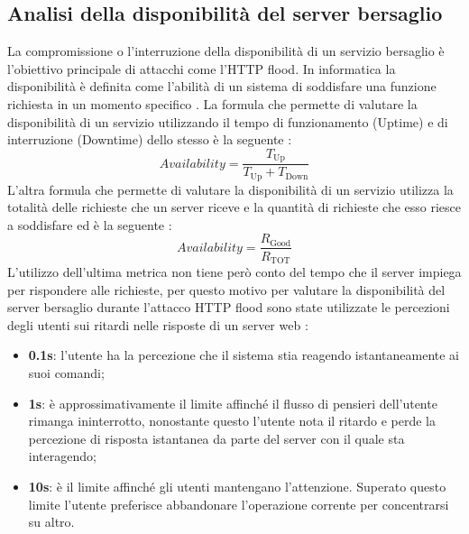 \subsection{Analisi della disponibilità del server bersaglio}
La compromissione o l'interruzione della disponibilità di un servizio bersaglio è l'obiettivo principale di attacchi come l'HTTP flood. In informatica la disponibilità è definita come l'abilità di un sistema di soddisfare una funzione richiesta in un momento specifico \cite{availability}. 
La formula che permette di valutare la disponibilità di un servizio utilizzando il tempo di funzionamento (Uptime) e di interruzione (Downtime) dello stesso è la seguente \cite{formula_availability}:
\begin{equation} \label{formula1}
Availability = \frac{T_\text{Up}}{T_\text{Up}+T_\text{Down}}
\end{equation}
L'altra formula che permette di valutare la disponibilità di un servizio utilizza la totalità delle richieste che un server riceve e la quantità di richieste che esso riesce a soddisfare ed è la seguente \cite{formula_availability}:
\begin{equation} \label{formula2}
Availability = \frac{R_\text{Good}}{R_\text{TOT}}
\end{equation}
L'utilizzo dell'ultima metrica non tiene però conto del tempo che il server impiega per rispondere alle richieste, per questo motivo per valutare la disponibilità del server bersaglio durante l'attacco HTTP flood sono state utilizzate le percezioni degli utenti sui ritardi nelle risposte di un server web \cite{soglie_attenzione}:
\begin{itemize}
    \item \textbf{0.1s}: l'utente ha la percezione che il sistema stia reagendo istantaneamente ai suoi comandi;
    \item \textbf{1s}: è approssimativamente il limite affinché il flusso di pensieri dell'utente rimanga ininterrotto, nonostante questo l'utente nota il ritardo e perde la percezione di risposta istantanea da parte del server con il quale sta interagendo;
    \item \textbf{10s}: è il limite affinché gli utenti mantengano l'attenzione. Superato questo limite l'utente preferisce abbandonare l'operazione corrente per concentrarsi su altro.
\end{itemize}

